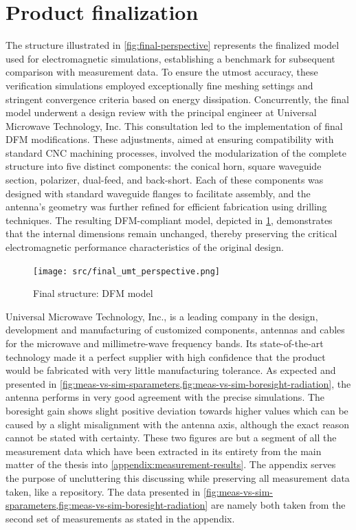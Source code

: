 \documentclass[11pt,a4paper,twoside,openany]{report}
\begin{document}
\section{Product finalization}
The structure illustrated in \cref{fig:final-perspective} represents the finalized model used for electromagnetic simulations, establishing a benchmark for subsequent comparison with measurement data. To ensure the utmost accuracy, these verification simulations employed exceptionally fine meshing settings and stringent convergence criteria based on energy dissipation. Concurrently, the final model underwent a design review with the principal engineer at Universal Microwave Technology, Inc. This consultation led to the implementation of final DFM modifications. These adjustments, aimed at ensuring compatibility with standard CNC machining processes, involved the modularization of the complete structure into five distinct components: the conical horn, square waveguide section, polarizer, dual-feed, and back-short. Each of these components was designed with standard waveguide flanges to facilitate assembly, and the antenna's geometry was further refined for efficient fabrication using drilling techniques. The resulting DFM-compliant model, depicted in \cref{fig:final-umt-perspective}, demonstrates that the internal dimensions remain unchanged, thereby preserving the critical electromagnetic performance characteristics of the original design.

\begin{figure}[!ht]
    \centering
    \texttt{[image: src/final\_umt\_perspective.png]}
    \caption{\label{fig:final-umt-perspective}Final structure: DFM model}
\end{figure}

Universal Microwave Technology, Inc., is a leading company in the design, development and manufacturing of customized components, antennas and cables for the microwave and millimetre-wave frequency bands. Its state-of-the-art technology made it a perfect supplier with high confidence that the product would be fabricated with very little manufacturing tolerance. As expected and presented in \cref{fig:meas-vs-sim-sparameters,fig:meas-vs-sim-boresight-radiation}, the antenna performs in very good agreement with the precise simulations. The boresight gain shows slight positive deviation towards higher values which can be caused by a slight misalignment with the antenna axis, although the exact reason cannot be stated with certainty. These two figures are but a segment of all the measurement data which have been extracted in its entirety from the main matter of the thesis into \cref{appendix:measurement-results}. The appendix serves the purpose of uncluttering this discussing while preserving all measurement data taken, like a repository. The data presented in \cref{fig:meas-vs-sim-sparameters,fig:meas-vs-sim-boresight-radiation} are namely both taken from the second set of measurements as stated in the appendix.
\end{document}
